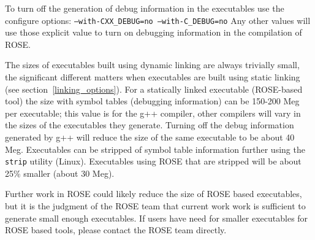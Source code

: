 To turn off the generation of debug information in the executables use the
configure options: {\tt --with-CXX\_DEBUG=no --with-C\_DEBUG=no}  Any other
values will use those explicit value to turn on debugging information in
the compilation of ROSE.

The sizes of executables built using dynamic linking are always trivially small,
the significant different matters when executables are built using static linking
(see section~\ref{linking_options}).  For a statically linked executable 
(ROSE-based tool) the size with symbol tables (debugging information) can be
150-200 Meg per executable; this value is for the g++ compiler, other compilers
will vary in the sizes of the executables they generate.  Turning off the 
debug information generated by g++ will reduce the size of the same executable
to be about 40 Meg.  Executables can be stripped of symbol table information
further using the {\tt strip} utility (Linux).  Executables using ROSE that are stripped
will be about 25\% smaller (about 30 Meg).

   Further work in ROSE could likely reduce the size of ROSE based executables,
but it is the judgment of the ROSE team that current work work is sufficient to
generate small enough executables.  If users have need for smaller executables
for ROSE based tools, please contact the ROSE team directly.



